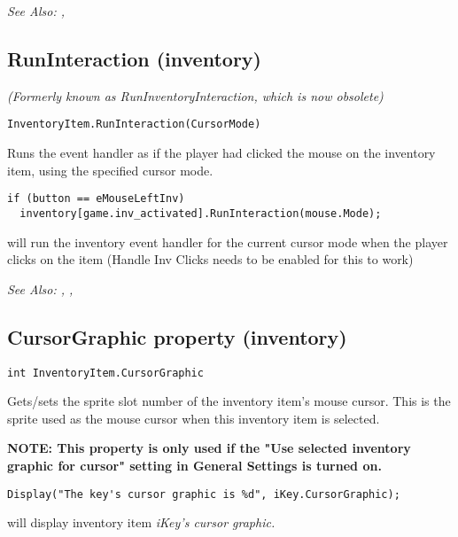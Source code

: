 \it{See Also:} ,


\subsection{RunInteraction (inventory)}\label{InventoryItem.RunInteraction}%

\it{(Formerly known as RunInventoryInteraction, which is now obsolete)}

\begin{verbatim}
InventoryItem.RunInteraction(CursorMode)
\end{verbatim}
Runs the event handler as if the player had clicked the mouse
on the inventory item, using the specified cursor mode.

\begin{verbatim}
if (button == eMouseLeftInv)
  inventory[game.inv_activated].RunInteraction(mouse.Mode);
\end{verbatim}
will run the inventory event handler for the current cursor mode when the player clicks
on the item (Handle Inv Clicks needs to be enabled for this to work)

\it{See Also:} ,
, 


\subsection{CursorGraphic property (inventory)}\label{InventoryItem.CursorGraphic}%

\begin{verbatim}
int InventoryItem.CursorGraphic
\end{verbatim}
Gets/sets the sprite slot number of the inventory item's mouse cursor. This is
the sprite used as the mouse cursor when this inventory item is selected.

\bf{NOTE:} This property is only used if the "Use selected inventory graphic for cursor"
setting in General Settings is turned on.

\begin{verbatim}
Display("The key's cursor graphic is %d", iKey.CursorGraphic);
\end{verbatim}
will display inventory item \it{iKey}'s cursor graphic.

